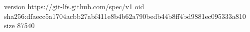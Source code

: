 version https://git-lfs.github.com/spec/v1
oid sha256:dfaecc5a1704acbb27abf411e8b4b62a790bedb44b8ff4bd9881ec095333a810
size 87540
